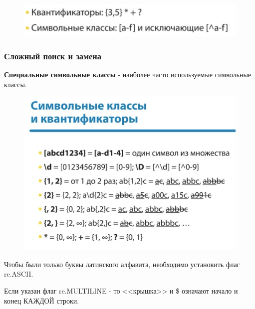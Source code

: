 \documentclass[a4paper,12pt]{article}
\begin{document}
	\begin{figure}[h!]
		\begin{center}
			{\includegraphics[scale = 1]{17.png}}
			\label{17}
		\end{center}
	\end{figure}

	\subsubsection{Сложный поиск и замена}
	
	{\bf Специальные символьные классы} - наиболее часто используемые символьные классы.
	
	\begin{figure}[h!]
		\begin{center}
			{\includegraphics[scale = 1]{18.png}}
			\label{18}
		\end{center}
	\end{figure}
	
	Чтобы были только буквы латинского алфавита, необходимо установить флаг re.ASCII.
	
	Если указан флаг re.MULTILINE - то <<крышка>> и \$ означают начало и конец КАЖДОЙ строки.
	
	
		
	
\end{document}
